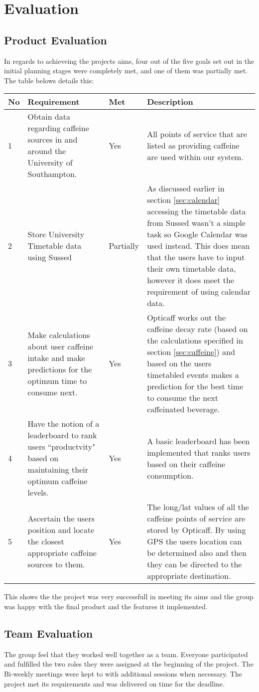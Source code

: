 \section{Evaluation}

\subsection{Product Evaluation}
In regards to achieveing the projects aims, four out of the five goals set out in the initial planning stages were completely met, and one of them was partially met. The table belows details this:

\begin{tabular}{|p{20pt}|p{140pt}|p{40pt}|p{210pt}|}
\hline
\textbf{No} & \textbf{Requirement} 													& \textbf{Met} 	& \textbf{Description} 
\\\hline
1		& Obtain data regarding caffeine sources in and around the University of Southampton.					& Yes		& All points of service that are listed as providing caffeine are used within our system. 
\\\hline
2 		& Store University Timetable data using Sussed										& Partially	& As discussed earlier in section \ref{sec:calendar} accessing the timetable data from Sussed wasn't a simple task so Google Calendar was used instead. This does mean that the users have to input their own timetable data, however it does meet the requirement of using calendar data. 
\\\hline
3 		& Make calculations about user caffeine intake and make predictions for the optimum time to consume next.		& Yes		& Opticaff works out the caffeine decay rate (based on the calculations specified in section \ref{sec:caffeine}) and based on the users timetabled events makes a prediction for the best time to consume the next caffeinated beverage. 	
\\\hline
4 		& Have the notion of a leaderboard to rank users ``productvity" based on maintaining their optimum caffeine levels.	& Yes		& A basic leaderboard has been implemented that ranks users based on their caffeine consumption. 
\\\hline
5 		& Ascertain the users position and locate the closest appropriate caffeine sources to them.				& Yes		& The long/lat values of all the caffeine points of service are stored by Opticaff. By using GPS the users location can be determined also and then they can be directed to the appropriate destination. 
\\\hline
\end{tabular}

This shows the the project was very successfull in meeting its aims and the group was happy with the final product and the features it implemented.

\subsection{Team Evaluation}
The group feel that they worked well together as a team. Everyone participated and fulfilled the two roles they were assigned at the beginning of the project. The Bi-weekly meetings were kept to with additional sessions when necessary. The project met its requirements and was delivered on time for the deadline. 
